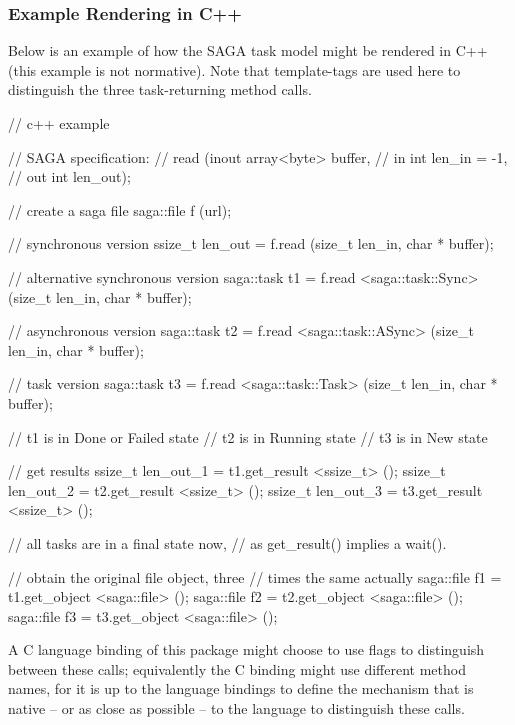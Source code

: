  \subsubsection{Example Rendering in C++}
 
  Below is an example of how the SAGA task model might be
  rendered in C++ (this example is not normative).  Note that
  template-tags are used here to distinguish the three
  task-returning method calls.
 
 \begin{mycode}
  // c++ example
 
  // SAGA specification:
  //  read        (inout array<byte>             buffer,
  //               in    int                     len_in = -1,
  //               out   int                     len_out);
 
  // create a saga file
  saga::file f (url);
 
  // synchronous version
  ssize_t len_out = f.read (size_t   len_in, 
                            char   * buffer);
                             
 
  // alternative synchronous version
  saga::task t1   = f.read <saga::task::Sync>
                           (size_t    len_in,
                            char    * buffer);
 
  // asynchronous version
  saga::task t2   = f.read <saga::task::ASync>
                           (size_t    len_in, 
                            char    * buffer);
 
  // task version
  saga::task t3   = f.read <saga::task::Task>
                           (size_t    len_in,
                            char    * buffer);
 
  // t1 is in Done or Failed state
  // t2 is in Running state
  // t3 is in New state
 
  // get results
  ssize_t len_out_1 = t1.get_result <ssize_t> ();
  ssize_t len_out_2 = t2.get_result <ssize_t> ();
  ssize_t len_out_3 = t3.get_result <ssize_t> ();
 
  // all tasks are in a final state now, 
  // as get_result() implies a wait().
 
  // obtain the original file object, three 
  // times the same actually
  saga::file f1 = t1.get_object <saga::file> ();
  saga::file f2 = t2.get_object <saga::file> ();
  saga::file f3 = t3.get_object <saga::file> ();
 \end{mycode}
 
  A C language binding of this package might choose to use flags
  to distinguish between these calls;
  equivalently the C binding might
  use different method names, for it is up to the language
  bindings to define the mechanism that is native -- or as close
  as possible -- to the language to distinguish these calls.
 

